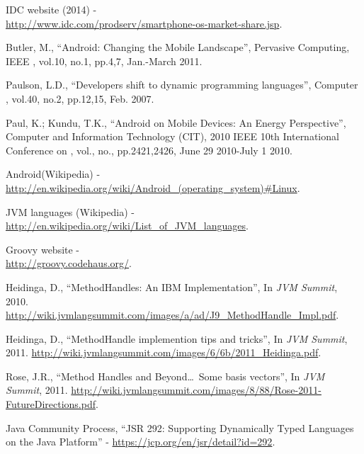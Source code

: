 \documentclass{sig-alternate}
\def \ANDROID{Android\xspace}
\def \JVM{JVM\xspace}
\begin{document}
\begin{thebibliography}{}

  IDC website (2014) - \\ \url{http://www.idc.com/prodserv/smartphone-os-market-share.jsp}.

  Butler, M., ``\ANDROID: Changing the Mobile Landscape'', Pervasive Computing, IEEE , vol.10, no.1, pp.4,7, Jan.-March 2011.

  Paulson, L.D., ``Developers shift to dynamic programming languages'', Computer , vol.40, no.2, pp.12,15, Feb. 2007.

  Paul, K.; Kundu, T.K., ``\ANDROID on Mobile Devices: An Energy Perspective'', Computer and Information Technology (CIT), 2010 IEEE 10th International Conference on , vol., no., pp.2421,2426, June 29 2010-July 1 2010.

  \ANDROID (Wikipedia) - \\ \url{http://en.wikipedia.org/wiki/Android\_(operating\_system)#Linux}.

  \JVM languages (Wikipedia) - \\ \url{http://en.wikipedia.org/wiki/List\_of\_JVM\_languages}.

  Groovy website - \\ \url{http://groovy.codehaus.org/}.
  
  Heidinga, D., ``MethodHandles: An IBM Implementation'', In {\it JVM Summit}, 2010. \url{http://wiki.jvmlangsummit.com/images/a/ad/J9_MethodHandle_Impl.pdf}.

  Heidinga, D., ``MethodHandle implemention tips and tricks'', In {\it JVM Summit}, 2011. \url{http://wiki.jvmlangsummit.com/images/6/6b/2011_Heidinga.pdf}.

  Rose, J.R., ``Method Handles and Beyond\dots~Some basis vectors'', In {\it JVM Summit}, 2011. \url{http://wiki.jvmlangsummit.com/images/8/88/Rose-2011-FutureDirections.pdf}.

  Java Community Process, ``JSR 292: Supporting Dynamically Typed Languages on the Java{\scriptsize\texttrademark} Platform'' - \url{https://jcp.org/en/jsr/detail?id=292}.


\end{thebibliography}
\end{document}
